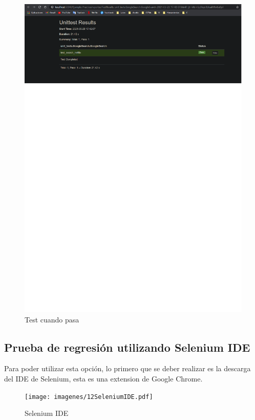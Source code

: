 \documentclass[conference]{IEEEtran}
\begin{document}
\begin{figure}[H]
\centering
\includegraphics[scale=0.47]{imagenes/11testecompleto.pdf}
\caption{Test cuando pasa}
\end{figure}


\subsection{Prueba de regresión utilizando Selenium IDE}

Para poder utilizar esta opción, lo primero que se deber realizar es la descarga del IDE de Selenium, esta es una extension de Google Chrome.

\begin{figure}[H]
\centering
\texttt{[image: imagenes/12SeleniumIDE.pdf]}
\caption{Selenium IDE}
\end{figure}
\end{document}
